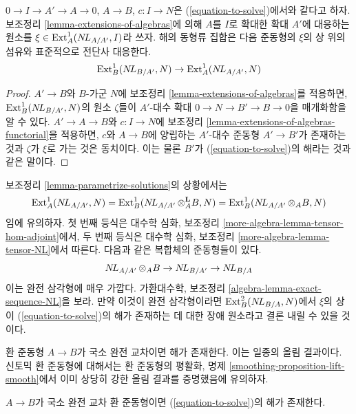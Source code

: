 \begin{lemma}
\label{lemma-parametrize-solutions}
$0\to I\to A'\to A\to0$, $A\to B$, $c:I\to N$은
(\ref{equation-to-solve})에서와 같다고 하자. 보조정리
\ref{lemma-extensions-of-algebras}에 의해 $A$를 $I$로 확대한 확대 $A'$에
대응하는 원소를 $\xi\in\mathop{\mathrm{Ext}}\nolimits^1_A(\mathop{N\!L}\nolimits_{A/A'},I)$라 쓰자. 해의 동형류
집합은 다음 준동형의 $\xi$의 상 위의 섬유와 표준적으로 전단사 대응한다.
$$
\mathop{\mathrm{Ext}}\nolimits^1_B(\mathop{N\!L}\nolimits_{B/A'}, N) \to \mathop{\mathrm{Ext}}\nolimits^1_A(\mathop{N\!L}\nolimits_{A/A'}, N)
$$
\end{lemma}

\begin{proof}
$A'\to B$와 $B$-가군 $N$에 보조정리
\ref{lemma-extensions-of-algebras}를 적용하면,
$\mathop{\mathrm{Ext}}\nolimits^1_B(\mathop{N\!L}\nolimits_{B/A'},N)$의 원소 $\zeta$들이 $A'$-대수 확대
$0\to N\to B'\to B\to0$을 매개화함을 알 수 있다. $A'\to A\to B$와
$c:I\to N$에 보조정리
\ref{lemma-extensions-of-algebras-functorial}을 적용하면, $c$와
$A\to B$에 양립하는 $A'$-대수 준동형 $A'\to B'$가 존재하는 것과
$\zeta$가 $\xi$로 가는 것은 동치이다. 이는 물론 $B'$가
(\ref{equation-to-solve})의 해라는 것과 같은 말이다.
\end{proof}

\begin{remark}
\label{remark-parametrize-solutions}
보조정리 \ref{lemma-parametrize-solutions}의 상황에서는
$$
\mathop{\mathrm{Ext}}\nolimits^1_A(\mathop{N\!L}\nolimits_{A/A'}, N) =
\mathop{\mathrm{Ext}}\nolimits^1_B(\mathop{N\!L}\nolimits_{A/A'} \otimes_A^\mathbf{L} B, N) =
\mathop{\mathrm{Ext}}\nolimits^1_B(\mathop{N\!L}\nolimits_{A/A'} \otimes_A B, N)
$$
임에 유의하자. 첫 번째 등식은 대수학 심화, 보조정리
\ref{more-algebra-lemma-tensor-hom-adjoint}에서, 두 번째 등식은
대수학 심화, 보조정리 \ref{more-algebra-lemma-tensor-NL}에서 따른다.
다음과 같은 복합체의 준동형들이 있다.
$$
\mathop{N\!L}\nolimits_{A/A'} \otimes_A B \to \mathop{N\!L}\nolimits_{B/A'} \to \mathop{N\!L}\nolimits_{B/A}
$$
이는 완전 삼각형에 매우 가깝다. 가환대수학, 보조정리
\ref{algebra-lemma-exact-sequence-NL}을 보라. 만약 이것이 완전
삼각형이라면 $\mathop{\mathrm{Ext}}\nolimits^2_B(\mathop{N\!L}\nolimits_{B/A},N)$에서 $\xi$의 상이
(\ref{equation-to-solve})의 해가 존재하는 데 대한 장애 원소라고
결론 내릴 수 있을 것이다.
\end{remark}

\noindent
환 준동형 $A\to B$가 국소 완전 교차이면 해가 존재한다. 이는 일종의
올림 결과이다. 신토믹 환 준동형에 대해서는 환 준동형의 평활화,
명제 \ref{smoothing-proposition-lift-smooth}에서 이미 상당히 강한
올림 결과를 증명했음에 유의하자.

\begin{lemma}
\label{lemma-existence-lci}
$A\to B$가 국소 완전 교차 환 준동형이면
(\ref{equation-to-solve})의 해가 존재한다.
\end{lemma}

